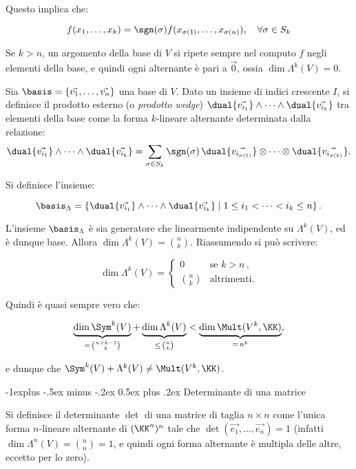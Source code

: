 \documentclass[10pt,landscape]{article}
\makeatletter
\renewcommand{\subsection}{\@startsection{subsection}{2}{0mm}%
	{-1explus -.5ex minus -.2ex}%
	{0.5ex plus .2ex}%
	{\normalfont\normalsize\bfseries}}
\makeatother
\begin{document}
\begin{multicols}{3}
		\vskip 0.05in
		
		Questo implica che:
		
		\[ f(x_1, \ldots, x_k) = \sgn(\sigma) f(x_{\sigma(1)}, \ldots, x_{\sigma(n)}), \quad \forall \sigma \in S_k \]
		
		Se $k > n$, un argomento della base di $V$ si ripete sempre nel
		computo $f$ negli elementi della base, e quindi ogni alternante è
		pari a $\vec{0}$, ossia $\dim \Lambda^k(V) = 0$.
		
		Sia $\basis = \{\vec{v_1}, \ldots, \vec{v_n}\}$ una base
		di $V$. Dato un insieme di indici crescente $I$,
		si definisce il prodotto esterno (o \textit{prodotto wedge}) 
		$\dual{\vec{v_{i_1}}} \wedge \cdots \wedge \dual{\vec{v_{i_k}}}$
		tra elementi della base come la forma $k$-lineare alternante
		determinata dalla relazione:
		\[ \dual{\vec{v_{i_1}}} \wedge \cdots \wedge \dual{\vec{v_{i_k}}} = \sum_{\sigma \in S_k} \sgn(\sigma) \, \dual{\vec{v_{i_{\sigma(1)}}}} \otimes \cdots \otimes \dual{\vec{v_{i_{\sigma(k)}}}}. \]
		
		Si definisce l'insieme:
		
		\[\basis_{\Lambda} = \left\{  \dual{\vec{v_{i_1}}} \wedge \cdots \wedge \dual{\vec{v_{i_k}}} \mid 1 \leq i_1 < \cdots < i_k \leq n \right\}. \]
		
		L'insieme $\basis_{\Lambda}$ è sia generatore che linearmente
		indipendente su $\Lambda^k(V)$, ed è dunque base. Allora
		$\dim \Lambda^k(V) = \binom{n}{k}$. Riassumendo si può scrivere:
		
		\[\dim \Lambda^k(V) = \begin{cases} 0 & \text{se } k > n\,, \\ \binom{n}{k} & \text{altrimenti}. \end{cases}\]
		
		Quindi è quasi sempre vero che:
		
		\[ \underbrace{\dim \Sym^k(V)}_{= \, \binom{n+k-1}{k}} + \underbrace{\dim \Lambda^k(V)}_{\leq \, \binom{n}{k}} < \underbrace{\dim \Mult(V^k, \KK)}_{=\,n^k}, \]
		
		e dunque che $\Sym^k(V) + \Lambda^k(V) \neq \Mult(V^k, \KK)$.

		\subsection{Determinante di una matrice}
		
		Si definisce il determinante $\det$ di una matrice di taglia
		$n \times n$ come l'unica forma $n$-lineare alternante di $(\KK^n)^n$
		tale che $\det(\vec{e_1}, \ldots, \vec{e_n}) = 1$ (infatti
		$\dim \Lambda^n (V) = \binom{n}{n} = 1$, e quindi ogni forma
		alternante è multipla delle altre, eccetto per lo zero).
		

\end{multicols}
\end{document}
